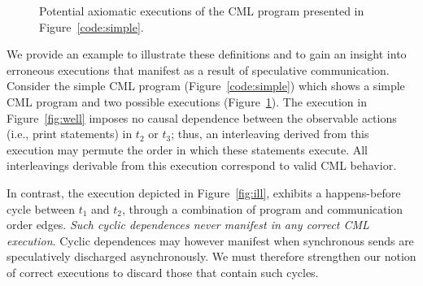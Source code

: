 \begin{figure}
\begin{minipage}{0.5\textwidth}
\end{minipage}
\caption{Potential axiomatic executions of the CML program presented in Figure~\ref{code:simple}.}
\label{fig:pgm_and_execs}
\end{figure}

We provide an example to illustrate these definitions and to gain an insight
into erroneous executions that manifest as a result of speculative
communication. Consider the simple CML program (Figure~\ref{code:simple}) which
shows a simple CML program and two possible executions
(Figure~\ref{fig:pgm_and_execs}). The execution in Figure~\ref{fig:well}
imposes no causal dependence between the observable actions (i.e., print
statements) in $t_2$ or $t_3$; thus, an interleaving derived from this
execution may permute the order in which these statements execute. All
interleavings derivable from this execution correspond to valid CML behavior.

In contrast, the execution depicted in Figure~\ref{fig:ill}, exhibits a
happens-before cycle between $t_1$ and $t_2$, through a combination of program
and communication order edges. \emph{Such cyclic dependences never manifest in
any correct CML execution}. Cyclic dependences may however manifest when
synchronous sends are speculatively discharged asynchronously. We must
therefore strengthen our notion of correct executions to discard those that
contain such cycles.

